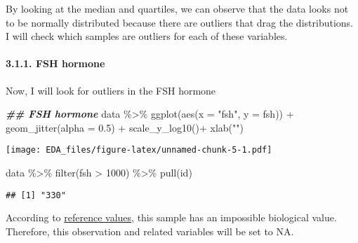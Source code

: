 \documentclass[
]{article}
\newenvironment{Shaded}{\begin{snugshade}}{\end{snugshade}}
\newcommand{\AttributeTok}[1]{\textcolor[rgb]{0.77,0.63,0.00}{#1}}
\newcommand{\ConstantTok}[1]{\textcolor[rgb]{0.00,0.00,0.00}{#1}}
\newcommand{\DecValTok}[1]{\textcolor[rgb]{0.00,0.00,0.81}{#1}}
\newcommand{\DocumentationTok}[1]{\textcolor[rgb]{0.56,0.35,0.01}{\textbf{\textit{#1}}}}
\newcommand{\FloatTok}[1]{\textcolor[rgb]{0.00,0.00,0.81}{#1}}
\newcommand{\FunctionTok}[1]{\textcolor[rgb]{0.00,0.00,0.00}{#1}}
\newcommand{\NormalTok}[1]{#1}
\newcommand{\OtherTok}[1]{\textcolor[rgb]{0.56,0.35,0.01}{#1}}
\newcommand{\SpecialCharTok}[1]{\textcolor[rgb]{0.00,0.00,0.00}{#1}}
\newcommand{\StringTok}[1]{\textcolor[rgb]{0.31,0.60,0.02}{#1}}
\begin{document}
By looking at the median and quartiles, we can observe that the data
looks not to be normally distributed because there are outliers that
drag the distributions. I will check which samples are outliers for each
of these variables.

\hypertarget{fsh-hormone}{%
\paragraph{3.1.1. FSH hormone}\label{fsh-hormone}}

Now, I will look for outliers in the FSH hormone

\begin{Shaded}
\begin{Highlighting}[]
\DocumentationTok{\#\# FSH hormone}
\NormalTok{data }\SpecialCharTok{\%\textgreater{}\%} 
  \FunctionTok{ggplot}\NormalTok{(}\FunctionTok{aes}\NormalTok{(}\AttributeTok{x =} \StringTok{"fsh"}\NormalTok{, }\AttributeTok{y =}\NormalTok{ fsh)) }\SpecialCharTok{+}
  \FunctionTok{geom\_jitter}\NormalTok{(}\AttributeTok{alpha =} \FloatTok{0.5}\NormalTok{) }\SpecialCharTok{+}
  \FunctionTok{scale\_y\_log10}\NormalTok{()}\SpecialCharTok{+}
  \FunctionTok{xlab}\NormalTok{(}\StringTok{""}\NormalTok{)}
\end{Highlighting}
\end{Shaded}

\texttt{[image: EDA\_files/figure-latex/unnamed-chunk-5-1.pdf]}

\begin{Shaded}
\begin{Highlighting}[]
\NormalTok{data }\SpecialCharTok{\%\textgreater{}\%} 
  \FunctionTok{filter}\NormalTok{(fsh }\SpecialCharTok{\textgreater{}} \DecValTok{1000}\NormalTok{) }\SpecialCharTok{\%\textgreater{}\%} 
  \FunctionTok{pull}\NormalTok{(id)}
\end{Highlighting}
\end{Shaded}

\begin{verbatim}
## [1] "330"
\end{verbatim}

According to
\href{https://www.mountsinai.org/health-library/tests/follicle-stimulating-hormone-fsh-blood-test}{reference
values}, this sample has an impossible biological value. Therefore, this
observation and related variables will be set to NA.

\begin{Shaded}
\end{Shaded}
\end{document}

